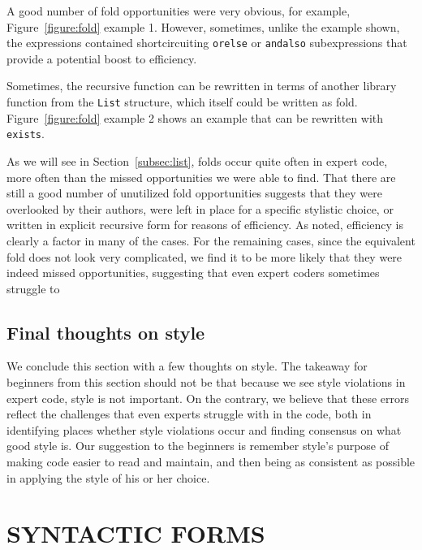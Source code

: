 \documentclass[12pt,abstracton]{scrartcl}
\begin{document}
A good number of fold opportunities were very obvious, for example,
Figure~\ref{figure:fold} example 1. However, sometimes,
unlike the example shown, the expressions contained shortcircuiting
\texttt{orelse} or \texttt{andalso} subexpressions that provide
a potential boost to efficiency.

Sometimes, the recursive function can be rewritten in terms of another library function
from the \texttt{List} structure, which itself could be written as fold.
Figure~\ref{figure:fold} example 2 shows an example that can be rewritten with \texttt{exists}.

As we will see in Section~\ref{subsec:list}, folds occur quite often in
expert code, more often than the missed opportunities we were able to find.
That there are still a good number of unutilized fold opportunities
suggests that they were overlooked by their authors, 
were left in place for a specific stylistic choice, or
written in explicit recursive form for reasons of efficiency.
As noted, efficiency is clearly a factor in many of the cases.
For the remaining cases, since the equivalent fold does not
look very complicated, we find it to be more likely that they were
indeed missed opportunities, suggesting that even expert
coders sometimes struggle to 
\subsection{Final thoughts on style}\label{subsec:stylethoughts}
We conclude this section with a few thoughts on style.
The takeaway for beginners from this section should not be
that because we see style violations in expert code,
style is not important. On the contrary, we believe that
these errors reflect the challenges that even experts
struggle with in the code, both in identifying places
whether style violations occur and finding consensus on
what good style is. Our suggestion to the beginners is
remember style's purpose of making code easier to read
and maintain, and then being as consistent as possible
in applying the style of his or her choice.
\section{SYNTACTIC FORMS}\label{sec:syntax}
\end{document}
